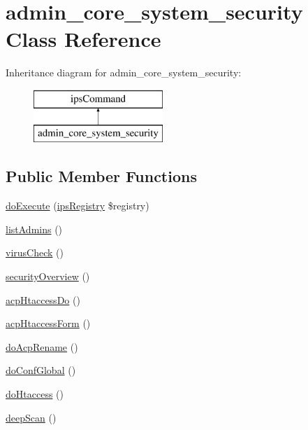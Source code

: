 \hypertarget{classadmin__core__system__security}{\section{admin\-\_\-core\-\_\-system\-\_\-security Class Reference}
\label{classadmin__core__system__security}
}
Inheritance diagram for admin\-\_\-core\-\_\-system\-\_\-security\-:\begin{figure}[H]
\begin{center}
\leavevmode
\includegraphics[height=2.000000cm]{classadmin__core__system__security}
\end{center}
\end{figure}
\subsection*{Public Member Functions}
\begin{DoxyCompactItemize}
\item 
\hyperlink{classadmin__core__system__security_afbc4e912a0604b94d47d66744c64d8ba}{do\-Execute} (\hyperlink{classips_registry}{ips\-Registry} \$registry)
\item 
\hyperlink{classadmin__core__system__security_a7942a187e8463b9f42e43e8ca7674ac7}{list\-Admins} ()
\item 
\hyperlink{classadmin__core__system__security_a4872e9f3873706bc45b7167a8c2fc1bf}{virus\-Check} ()
\item 
\hyperlink{classadmin__core__system__security_ad16afe43a1dbb272cdc28093be8f7516}{security\-Overview} ()
\item 
\hyperlink{classadmin__core__system__security_aa737f6a4855fdf3f1950f89fd7a1afd1}{acp\-Htaccess\-Do} ()
\item 
\hyperlink{classadmin__core__system__security_ae29543162972bd4cf7c08528cfd95917}{acp\-Htaccess\-Form} ()
\item 
\hyperlink{classadmin__core__system__security_a8f7adfbd79908e840ea1fb2ffff69f18}{do\-Acp\-Rename} ()
\item 
\hyperlink{classadmin__core__system__security_ab3ead640b04df0bb2513b9b4aea43314}{do\-Conf\-Global} ()
\item 
\hyperlink{classadmin__core__system__security_af4ce5a03830fe37f4c3db6a7f3f0ad99}{do\-Htaccess} ()
\item 
\hyperlink{classadmin__core__system__security_a9e43a5657804128c75c3a3bd8f6182d2}{deep\-Scan} ()
\end{DoxyCompactItemize}
